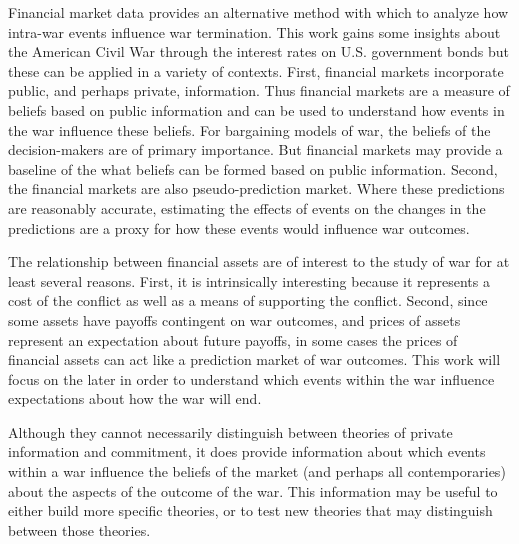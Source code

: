 Financial market data provides an alternative method with which to analyze how intra-war events influence war termination.
This work gains some insights about the American Civil War through the interest rates on U.S. government bonds but these can be applied in a variety of contexts.
First, financial markets incorporate public, and perhaps private, information.
Thus financial markets are a measure of beliefs based on public information and can be used to understand how events in the war influence these beliefs.
For bargaining models of war, the beliefs of the decision-makers are of primary importance.
But financial markets may provide a baseline of the what beliefs can be formed based on public information.
Second, the financial markets are also pseudo-prediction market.
Where these predictions are reasonably accurate, estimating the effects of events on the changes in the predictions are a proxy for how these events would influence war outcomes.

The relationship between financial assets are of interest to the study of war for at least several reasons.
First, it is intrinsically interesting because it represents a cost of the conflict as well as a means of supporting the conflict.
Second, since some assets have payoffs contingent on war outcomes, and prices of assets represent an expectation about future payoffs, in some cases the prices of financial assets can act like a prediction market of war outcomes.
This work will focus on the later in order to understand which events within the war influence expectations about how the war will end.

Although they cannot necessarily distinguish between theories of private information and commitment, it does provide information about which events within a war influence the beliefs of the market (and perhaps all contemporaries) about the aspects of the outcome of the war.
This information may be useful to either build more specific theories, or to test new theories that may distinguish between those theories.

